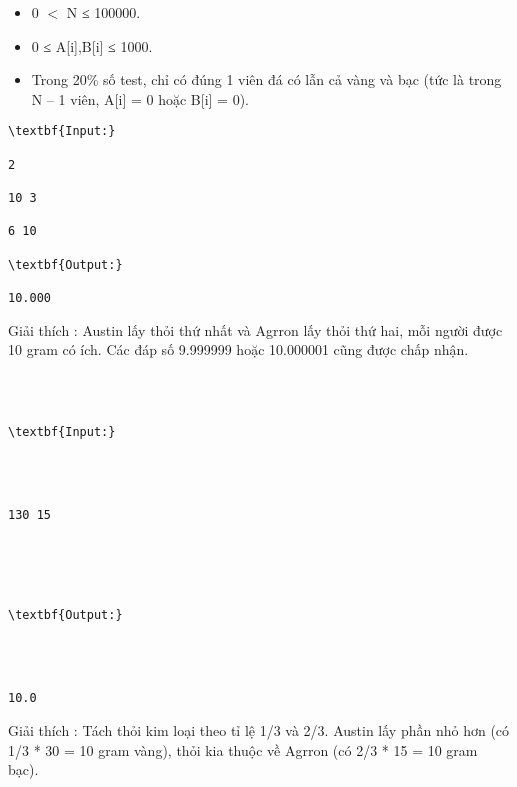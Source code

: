 \begin{itemize}
	\item     0 $<$ N ≤ 100000.   
	\item     0 ≤ A[i],B[i] ≤ 1000.   
	\item     Trong 20\% số test, chỉ có đúng 1 viên đá có lẫn cả vàng và bạc (tức là trong N – 1 viên, A[i] = 0 hoặc B[i] = 0).   
\end{itemize}
\begin{verbatim}
\textbf{Input:}

2

10 3

6 10

\textbf{Output:}

10.000\end{verbatim}

Giải thích        : Austin lấy thỏi thứ nhất và Agrron lấy thỏi thứ hai, mỗi người được 10 gram có ích. Các đáp số 9.999999 hoặc 10.000001 cũng được chấp nhận.
\begin{verbatim}



\textbf{Input:}




130 15





\textbf{Output:}




10.0\end{verbatim}

Giải thích        : Tách thỏi kim loại theo tỉ lệ 1/3 và 2/3. Austin lấy phần nhỏ hơn (có 1/3 * 30 = 10 gram vàng), thỏi kia thuộc về Agrron (có 2/3 * 15 = 10 gram bạc).